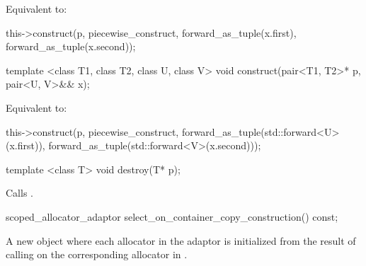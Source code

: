 \begin{itemdescr}
\pnum
\effects Equivalent to:
\begin{codeblock}
this->construct(p, piecewise_construct,
                forward_as_tuple(x.first),
                forward_as_tuple(x.second));
\end{codeblock}
\end{itemdescr}

%
%
\begin{itemdecl}
template <class T1, class T2, class U, class V>
  void construct(pair<T1, T2>* p, pair<U, V>&& x);
\end{itemdecl}

\begin{itemdescr}
\pnum
\effects Equivalent to:
\begin{codeblock}
this->construct(p, piecewise_construct,
                forward_as_tuple(std::forward<U>(x.first)),
                forward_as_tuple(std::forward<V>(x.second)));
\end{codeblock}
\end{itemdescr}

%
\begin{itemdecl}
template <class T>
  void destroy(T* p);
\end{itemdecl}

\begin{itemdescr}
\pnum
\effects Calls .
\end{itemdescr}

%
%
\begin{itemdecl}
scoped_allocator_adaptor select_on_container_copy_construction() const;
\end{itemdecl}

\begin{itemdescr}
\pnum
\returns A new  object where each allocator  in the
adaptor is initialized from the result of calling
 on the
corresponding allocator in .
\end{itemdescr}


